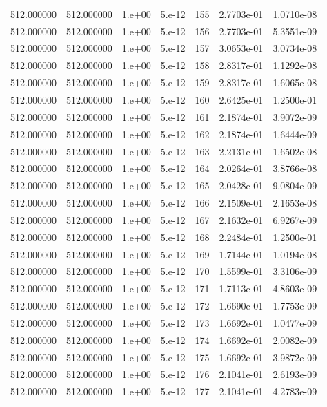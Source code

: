 \begin{table}[htbp]
\begin{tabular}{rrrrrrr}
512.000000 & 512.000000 & 1.e+00 & 5.e-12 & 155 & 2.7703e-01 & 1.0710e-08 \\
512.000000 & 512.000000 & 1.e+00 & 5.e-12 & 156 & 2.7703e-01 & 5.3551e-09 \\
512.000000 & 512.000000 & 1.e+00 & 5.e-12 & 157 & 3.0653e-01 & 3.0734e-08 \\
512.000000 & 512.000000 & 1.e+00 & 5.e-12 & 158 & 2.8317e-01 & 1.1292e-08 \\
512.000000 & 512.000000 & 1.e+00 & 5.e-12 & 159 & 2.8317e-01 & 1.6065e-08 \\
512.000000 & 512.000000 & 1.e+00 & 5.e-12 & 160 & 2.6425e-01 & 1.2500e-01 \\
512.000000 & 512.000000 & 1.e+00 & 5.e-12 & 161 & 2.1874e-01 & 3.9072e-09 \\
512.000000 & 512.000000 & 1.e+00 & 5.e-12 & 162 & 2.1874e-01 & 1.6444e-09 \\
512.000000 & 512.000000 & 1.e+00 & 5.e-12 & 163 & 2.2131e-01 & 1.6502e-08 \\
512.000000 & 512.000000 & 1.e+00 & 5.e-12 & 164 & 2.0264e-01 & 3.8766e-08 \\
512.000000 & 512.000000 & 1.e+00 & 5.e-12 & 165 & 2.0428e-01 & 9.0804e-09 \\
512.000000 & 512.000000 & 1.e+00 & 5.e-12 & 166 & 2.1509e-01 & 2.1653e-08 \\
512.000000 & 512.000000 & 1.e+00 & 5.e-12 & 167 & 2.1632e-01 & 6.9267e-09 \\
512.000000 & 512.000000 & 1.e+00 & 5.e-12 & 168 & 2.2484e-01 & 1.2500e-01 \\
512.000000 & 512.000000 & 1.e+00 & 5.e-12 & 169 & 1.7144e-01 & 1.0194e-08 \\
512.000000 & 512.000000 & 1.e+00 & 5.e-12 & 170 & 1.5599e-01 & 3.3106e-09 \\
512.000000 & 512.000000 & 1.e+00 & 5.e-12 & 171 & 1.7113e-01 & 4.8603e-09 \\
512.000000 & 512.000000 & 1.e+00 & 5.e-12 & 172 & 1.6690e-01 & 1.7753e-09 \\
512.000000 & 512.000000 & 1.e+00 & 5.e-12 & 173 & 1.6692e-01 & 1.0477e-09 \\
512.000000 & 512.000000 & 1.e+00 & 5.e-12 & 174 & 1.6692e-01 & 2.0082e-09 \\
512.000000 & 512.000000 & 1.e+00 & 5.e-12 & 175 & 1.6692e-01 & 3.9872e-09 \\
512.000000 & 512.000000 & 1.e+00 & 5.e-12 & 176 & 2.1041e-01 & 2.6193e-09 \\
512.000000 & 512.000000 & 1.e+00 & 5.e-12 & 177 & 2.1041e-01 & 4.2783e-09 \\

\end{tabular}
\end{table}
